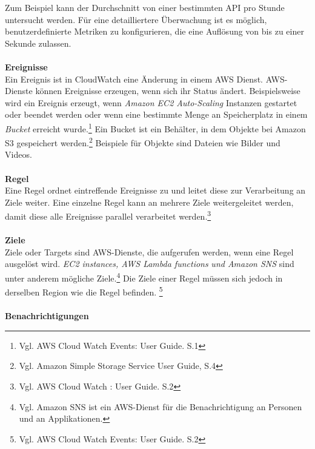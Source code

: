 Zum Beispiel kann der Durchschnitt von einer bestimmten API pro Stunde untersucht werden. Für eine detailliertere Überwachung ist es möglich, benutzerdefinierte Metriken zu konfigurieren, die eine Auflösung von bis zu einer Sekunde zulassen. %
\\\\
\textbf{Ereignisse}\\
Ein Ereignis ist in CloudWatch eine Änderung in einem AWS Dienst. AWS-Dienste können Ereignisse erzeugen, wenn sich ihr Status ändert. %
Beispielsweise wird ein Ereignis erzeugt, wenn \textit{Amazon EC2 Auto-Scaling} Instanzen gestartet oder beendet werden oder wenn eine bestimmte Menge an Speicherplatz in einem \textit{Bucket} erreicht wurde.\footnote{Vgl. AWS Cloud Watch Events: User Guide. S.1\cite{AMZ13}} Ein Bucket ist ein Behälter, in dem Objekte bei Amazon S3 gespeichert werden.\footnote{Vgl. Amazon Simple Storage Service User Guide, S.4\cite{AMZ18}} Beispiele für Objekte sind Dateien wie Bilder und Videos. 
\\\\
\textbf{Regel} \\
Eine Regel ordnet eintreffende Ereignisse zu und leitet diese zur Verarbeitung an Ziele weiter. Eine einzelne Regel kann an mehrere Ziele weitergeleitet werden, damit diese alle Ereignisse parallel verarbeitet werden.\footnote{Vgl. AWS Cloud Watch : User Guide. S.2\cite{AMZ13}}
\\\\
\textbf{Ziele} \\
Ziele oder Targets sind AWS-Dienste, die aufgerufen werden, wenn eine Regel ausgelöst wird.
\textit{EC2 instances, AWS Lambda functions} \textit{und Amazon SNS} sind unter anderem mögliche Ziele.\footnote{Vgl. Amazon SNS ist ein AWS-Dienst für die Benachrichtigung an Personen und an Applikationen.\cite{AMZ30}}
Die Ziele einer Regel müssen sich jedoch in derselben Region wie die Regel befinden.
\footnote{Vgl. AWS Cloud Watch Events: User Guide. S.2\cite{AMZ13}}
\\\\
\textbf{Benachrichtigungen}\\

